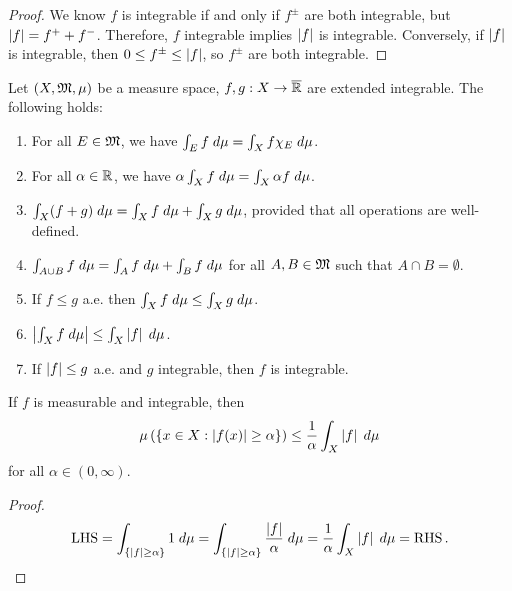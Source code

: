 \documentclass[a4paper]{article}
\begin{document}
\begin{proof}
We know $f$ is integrable if and only if $f^\pm$
are both integrable, but $\left\lvert f\right\rvert = f^+ + f^-$.
Therefore, $f$ integrable implies $\left\lvert f\right\rvert$ is integrable.
Conversely, if $\left\lvert f\right\rvert$ is integrable, then
$0 \leq f^\pm \leq \left\lvert f\right\rvert$, so $f^\pm$ are both
integrable.
\end{proof}

\begin{thm}
Let $(X, \mathfrak{M}, \mu)$ be a measure space,
$f, g : X \to \overline{\mathbb{R}}$ are extended integrable.
The following holds:
\begin{enumerate}
  \item For all $E \in \mathfrak{M}$, we have $\int_E f \; d \mu
  = \int_X f \chi_E \; d \mu$.

  \item For all $\alpha \in \mathbb{R}$, we have
  $\alpha \int_X f \; d \mu = \int_X \alpha f \; d \mu$.

  \item $\int_X (f + g) \; d \mu = \int_X f \; d \mu +
  \int_X g \; d \mu$, provided that all operations are
  well-defined.

  \item $\int_{A \cup B} f \; d \mu = \int_A f \; d \mu
  + \int_B f \; d \mu$ for all $A, B \in \mathfrak{M}$ such that
  $A \cap B = \emptyset$.

  \item If $f \leq g$ a.e. then $\int_X f \; d \mu \leq
  \int_X g \; d \mu$.

  \item $\left\lvert \int_X f \; d \mu\right\rvert \leq \int_X \left\lvert f\right\rvert \; d \mu$.

  \item If $\left\lvert f\right\rvert \leq g$ a.e. and $g$ integrable, then
  $f$ is integrable.
\end{enumerate}
\end{thm}

\begin{thm}
If $f$ is measurable and integrable, then
\[
\mu \left( \left\{ x \in X : \left\lvert f(x)\right\rvert \geq \alpha \right\} \right)
\leq \frac{1}{\alpha} \int_X \left\lvert f\right\rvert \; d \mu
\]
for all $\alpha \in (0, \infty)$.
\end{thm}

\begin{proof}
\[
\begin{aligned}
  \operatorname{LHS} = \int_{\left\{ \left\lvert f\right\rvert \geq \alpha \right\}} 1 \; d \mu
  = \int_{\left\{ \left\lvert f\right\rvert \geq \alpha \right\}}
  \frac{\left\lvert f\right\rvert}{\alpha} \; d \mu
  = \frac{1}{\alpha} \int_X \left\lvert f\right\rvert \; d \mu
  = \operatorname{RHS}.
\end{aligned}
\]
\end{proof}
\end{document}
